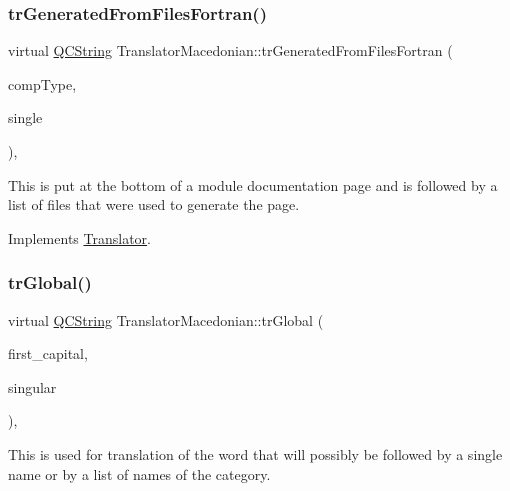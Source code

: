 \mbox{\label{class_translator_macedonian_a07310449a1bce631676f9afd786babc5}} 
\subsubsection{\texorpdfstring{trGeneratedFromFilesFortran()}{trGeneratedFromFilesFortran()}}
{\footnotesize\ttfamily virtual \mbox{\hyperlink{class_q_c_string}{Q\+C\+String}} Translator\+Macedonian\+::tr\+Generated\+From\+Files\+Fortran (\begin{DoxyParamCaption}\item[{\mbox{\hyperlink{class_class_def_ae70cf86d35fe954a94c566fbcfc87939}{Class\+Def\+::\+Compound\+Type}}}]{comp\+Type,  }\item[{bool}]{single }\end{DoxyParamCaption})\hspace{0.3cm}{\ttfamily [inline]}, {\ttfamily [virtual]}}

This is put at the bottom of a module documentation page and is followed by a list of files that were used to generate the page. 

Implements \mbox{\hyperlink{class_translator}{Translator}}.

\mbox{\label{class_translator_macedonian_a5bbb13810a5d357f373047aba8b47b53}} 
\subsubsection{\texorpdfstring{trGlobal()}{trGlobal()}}
{\footnotesize\ttfamily virtual \mbox{\hyperlink{class_q_c_string}{Q\+C\+String}} Translator\+Macedonian\+::tr\+Global (\begin{DoxyParamCaption}\item[{bool}]{first\+\_\+capital,  }\item[{bool}]{singular }\end{DoxyParamCaption})\hspace{0.3cm}{\ttfamily [inline]}, {\ttfamily [virtual]}}

This is used for translation of the word that will possibly be followed by a single name or by a list of names of the category. 

